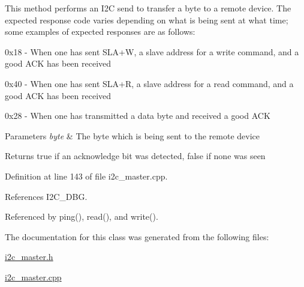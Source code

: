 This method performs an I2\-C send to transfer a byte to a remote device. The expected response code varies depending on what is being sent at what time; some examples of expected responses are as follows\-:
\begin{DoxyItemize}
\item {\ttfamily 0x18} -\/ When one has sent S\-L\-A+\-W, a slave address for a write command, and a good A\-C\-K has been received
\item {\ttfamily 0x40} -\/ When one has sent S\-L\-A+\-R, a slave address for a read command, and a good A\-C\-K has been received
\item {\ttfamily 0x28} -\/ When one has transmitted a data byte and received a good A\-C\-K 
\begin{DoxyParams}{Parameters}
{\em byte} & The byte which is being sent to the remote device \\
\hline
\end{DoxyParams}
\begin{DoxyReturn}{Returns}
{\ttfamily true} if an acknowledge bit was detected, {\ttfamily false} if none was seen 
\end{DoxyReturn}

\end{DoxyItemize}

Definition at line 143 of file i2c\-\_\-master.\-cpp.



References I2\-C\-\_\-\-D\-B\-G.



Referenced by ping(), read(), and write().



The documentation for this class was generated from the following files\-:\begin{DoxyCompactItemize}
\item 
\hyperlink{i2c__master_8h}{i2c\-\_\-master.\-h}\item 
\hyperlink{i2c__master_8cpp}{i2c\-\_\-master.\-cpp}\end{DoxyCompactItemize}
